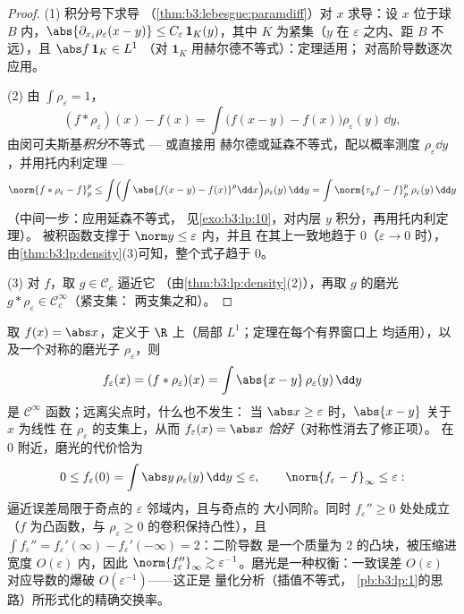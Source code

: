 \begin{proof}
(1) 积分号下求导
（\cref{thm:b3:lebesgue:paramdiff}）对 $x$ 求导：设 $x$ 位于球 
$B$ 内，$\abs{\partial_{x_i}\rho_\varepsilon(x - y)} \leq
C_\varepsilon\,\mathbf 1_{K}(y)$，其中 $K$ 为紧集（$y$
在 $\varepsilon$ 之内、距 $B$ 不远），且 $\abs f\,\mathbf 1_K \in L^1$
（对 $\mathbf 1_K$ 用赫尔德不等式）：定理适用；
对高阶导数逐次应用。

(2) 由 $\int\rho_\varepsilon = 1$，
\[
(f * \rho_\varepsilon)(x) - f(x)
= \int \bigl(f(x - y) - f(x)\bigr)\rho_\varepsilon(y)\,\dd y ,
\]
由闵可夫斯基\emph{积分}不等式 --- 或直接用
赫尔德或延森不等式，配以概率测度
$\rho_\varepsilon\dd y$，并用托内利定理 ---
\[
\norm{f*\rho_\varepsilon - f}_p^p
\leq \int\Bigl(\int\abs{f(x-y) -
f(x)}^p\dd x\Bigr)\rho_\varepsilon(y)\,\dd y
= \int \norm{\tau_yf - f}_p^p\;\rho_\varepsilon(y)\,\dd y
\]
（中间一步：应用延森不等式，
见\cref{exo:b3:lp:10}，对内层 $y$ 积分，再用托内利定理）。
被积函数支撑于 $\norm y \leq \varepsilon$ 内，并且
在其上一致地趋于 $0$（$\varepsilon \to 0$ 时），
由\cref{thm:b3:lp:density}(3)可知，整个式子趋于
$0$。

(3) 对 $f$，取 $g \in \mathcal C_c$ 逼近它
（由\cref{thm:b3:lp:density}(2)），再取 $g$ 的磨光 $g *
\rho_\varepsilon \in \mathcal C_c^\infty$（紧支集：
两支集之和）。
\end{proof}

\begin{example}
\label{ex:b3:lp:mollifyexample}
取 $f(x) = \abs x$，定义于 $\R$ 上（局部 $L^1$；定理在每个有界窗口上
均适用），以及一个对称的磨光子
$\rho_\varepsilon$，则
\[
f_\varepsilon(x) = (f * \rho_\varepsilon)(x)
= \int\abs{x - y}\,\rho_\varepsilon(y)\,\dd y
\]
是 $\mathcal C^\infty$ 函数；远离尖点时，什么也不发生：
当 $\abs x \geq \varepsilon$ 时，$\abs{x - y}$ 关于 $x$ 为线性
在 $\rho_\varepsilon$ 的支集上，从而 $f_\varepsilon(x) =
\abs x$ \emph{恰好}（对称性消去了修正项）。
在 $0$ 附近，磨光的代价恰为
\[
0 \leq f_\varepsilon(0) = \int\abs
y\,\rho_\varepsilon(y)\,\dd y \leq \varepsilon,
\qquad
\norm{f_\varepsilon - f}_\infty \leq \varepsilon :
\]
逼近误差局限于奇点的
$\varepsilon$ 邻域内，且与奇点的
大小同阶。同时 $f_\varepsilon'' \geq 0$ 处处成立
（$f$ 为凸函数，与 $\rho_\varepsilon
\geq 0$ 的卷积保持凸性），且 $\int f_\varepsilon'' =
f_\varepsilon'(\infty) - f_\varepsilon'(-\infty) = 2$：二阶导数
是一个质量为 $2$ 的凸块，被压缩进宽度
$O(\varepsilon)$ 内，因此 $\norm{f_\varepsilon''}_\infty \gtrsim
\varepsilon^{-1}$。磨光是一种权衡：一致误差
$O(\varepsilon)$ 对应导数的爆破
$O(\varepsilon^{-1})$——这正是
量化分析（插值不等式，
\cref{pb:b3:lp:1}的思路）所形式化的精确交换率。
\end{example}

